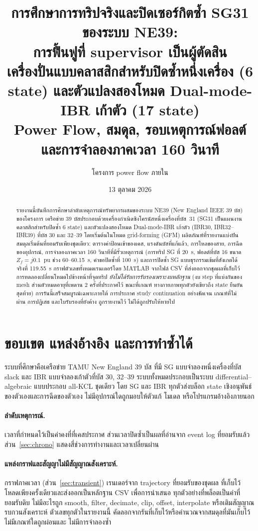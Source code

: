 \documentclass[12pt,a4paper]{article}
\title{\textbf{การศึกษาการทริปจริงและปิดเซอร์กิตซ้ำ SG31 ของระบบ NE39:\\ การฟื้นฟูที่ supervisor เป็นผู้ตัดสิน}\\[2pt]
\large เครื่องปั่นแบบคลาสสิกสำหรับปิดซ้ำหนึ่งเครื่อง (6 state) และตัวแปลงสองโหมด Dual-mode-IBR เก้าตัว (17 state)\\[1mm]
\normalsize Power Flow, สมดุล, รอบเหตุการณ์ฟอลต์ และการจำลองภาคเวลา 160 วินาที}
\author{โครงการ power flow ภายใน}
\date{13 ตุลาคม 2026}
\begin{document}
\maketitle

\begin{abstract}
รายงานนี้บันทึกการศึกษาลำดับเหตุการณ์ทรัพยากรผสมของระบบ NE39 (New England IEEE 39 บัส)
ของโครงการ เครือข่าย 39 บัสประกอบด้วยเครื่องกำเนิดซิงโครนัสหนึ่งเครื่องที่บัส~31
(SG31 เป็นแผนงานคลาสสิกสำหรับปิดซ้ำ 6 state) และตัวแปลงสองโหมด Dual-mode-IBR เก้าตัว
(IBR30, IBR32--IBR39) ที่บัส 30 และ 32--39 โดยเริ่มต้นในโหมด grid-forming (GFM)
ผลิตภัณฑ์ที่รายงานแบ่งปันสมดุลเริ่มต้นที่ยอมรับเพียงชุดเดียว: ตารางค่าป้อนเข้าของเคส,
แรงดันบัสที่แก้แล้ว, การไหลของสาย, การฉีดของอุปกรณ์, การจำลองภาคเวลา 160 วินาทีที่มีรั้วเหตุการณ์
(การทริป SG ที่ 20~s, ฟอลต์ที่บัส 16 ขนาด $Z_f=j0.1$~pu ช่วง 60--60.15~s,
คำขอปิดซ้ำที่ 100~s) และการปิดซ้ำ SG แบบธุรกรรมเข้มที่สังเกตได้จริงที่ 119.55~s
กราฟตัวเลขทั้งหมดเรนเดอร์โดย MATLAB จากไฟล์ CSV ที่ส่งออกจากชุดผลที่เก็บไว้
การทดลองเปลี่ยนโหมดไปข้างหน้าที่จุดทริป \emph{ยังไม่ได้รับการรับรองเพราะงบหลักฐาน}
(งบ step ที่แบ่งกันของ mesh ส่วนตัวหมดอายุที่เพดาน 2 ครั้งที่ประกาศไว้ ขณะที่เกณฑ์
ทางกายภาพทุกตัวยังเขียวถึง state ยืนยันสุดท้าย) การรันนี้เสร็จสมบูรณ์เฉพาะภายใต้
การประกาศ study continuation อย่างชัดเจน เกณฑ์ที่ไม่ผ่าน การปฏิเสธ และใบรับรองที่ยังค้าง
ถูกรายงานไว้ ไม่ได้ถูกปรับให้หายไป
\end{abstract}

\newpage
\tableofcontents
\newpage

\section{ขอบเขต แหล่งอ้างอิง และการทำซ้ำได้}\label{sec:scope}

ระบบที่ศึกษาคือเครือข่าย TAMU New England 39 บัส ที่มี SG แบบจำลองหนึ่งเครื่องที่บัส
slack และ IBR แบบจำลองเก้าตัวที่บัส 30, 32--39 ระบบทั้งหมดประกอบเป็นระบบ
differential--algebraic แบบประกอบ all-KCL ชุดเดียว โดย SG และ IBR ทุกตัวส่งบล็อก
state เชิงอนุพันธ์ของตัวเองและการฉีดของตัวเอง ไม่มีอุปกรณ์ใดถูกมอบให้ตัวแก้
โมเดล หรือโปรแกรมอ้างอิงภายนอก

\paragraph{ลำดับเหตุการณ์.}
เวลาที่กำหนดไว้เป็นค่าคงที่ที่เคสประกาศ ส่วนเวลาปิดซ้ำเป็นผลที่อ่านจาก event log
ที่ยอมรับแล้ว ส่วน~\ref{sec:chrono} แสดงสี่ช่วงการทำงานและเวลาเปลี่ยนผ่าน

\paragraph{แหล่งกราฟและสัญญาไม่มีสัญญาณสังเคราะห์.}
กราฟภาคเวลา (ส่วน~\ref{sec:transient}) เรนเดอร์จาก trajectory ที่ยอมรับของชุดผล
ที่เก็บไว้ โหลดเพียงครั้งเดียวและส่งออกเป็นหลักฐาน CSV เพื่อการนำเสนอ
ทุกตัวอย่างที่พล็อตเป็นค่าที่ยอมรับดิบ ไม่มีอะไรถูก smooth, filter, decimate,
clip, offset, interpolate หรือเติมสัญญาณรบกวนสังเคราะห์ ตัวเลขทุกตัวในรายงานนี้
คัดลอกจากรันที่เก็บไว้หรือคำนวณจากสมดุลที่มันเก็บไว้ ไม่มีเกณฑ์ใดถูกผ่อนและ
ไม่มีการจำลองซ้ำ
\end{document}
